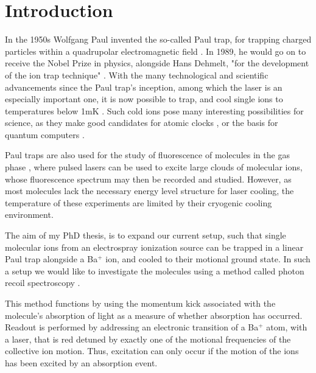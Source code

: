 
\chapter{Introduction}
\label{chap:intro}
In the 1950s Wolfgang Paul invented the so-called Paul trap, for trapping charged particles within a quadrupolar electromagnetic field \cite{PaulTrap}. In 1989, he would go on
 to receive the Nobel Prize in physics, alongside Hans Dehmelt, "for the development of the ion trap technique" \cite{NobelPrize.org}.
 With the many technological and scientific advancements since the Paul trap's inception, among which the laser is an especially important one,
 it is now possible to trap, and cool single ions to temperatures below 1mK \cite{WinelandSideband}.
 Such cold ions pose many interesting possibilities for science, as they make good candidates for atomic clocks \cite{King2022},
 or the basis for quantum computers \cite{ZiracZoller,Kielpinski2002}.

Paul traps are also used for the study of fluorescence of molecules in the gas phase \cite{Kjaer2021-lm},
where pulsed lasers can be used to excite large clouds of molecular ions, whose fluorescence spectrum may then be recorded and studied.
However, as most molecules lack the necessary energy level structure for laser cooling, the temperature of these experiments are limited by their cryogenic cooling environment.


The aim of my PhD thesis, is to expand our current setup, such that single molecular ions from an electrospray ionization source \cite{FennEsi} can be trapped in a linear Paul trap alongside a Ba$^+$ ion, and cooled to their motional ground state.
In such a setup we would like to investigate the molecules using a method called photon recoil spectroscopy \cite{PRS}.

This method functions by using the momentum kick associated with the molecule's absorption of light
as a measure of whether absorption has occurred. Readout is performed by addressing an electronic transition of a Ba$^+$ atom, with a laser, that is red detuned by exactly one of the motional frequencies of the collective ion motion. Thus, excitation can only occur if the motion of the ions has been excited by an absorption event.


